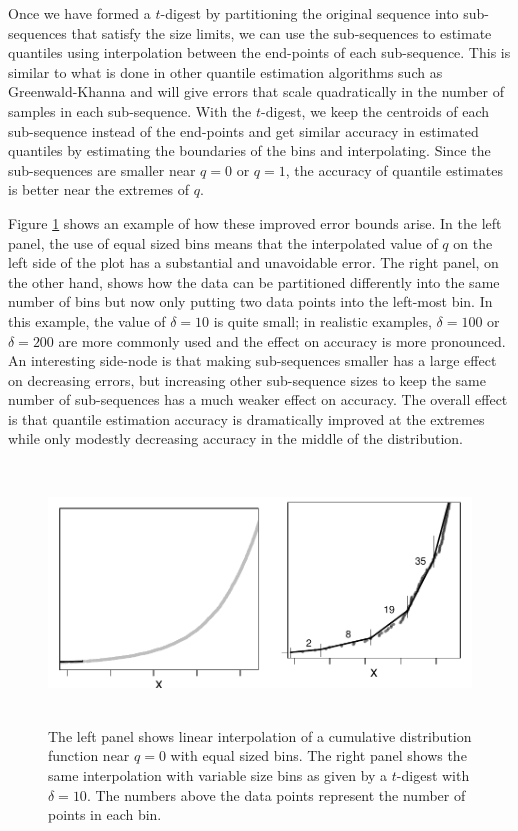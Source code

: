 \documentclass[11pt]{amsart}
\begin{document}
Once we have formed a $t$-digest by partitioning the original sequence into sub-sequences that satisfy the size limits, we can use the sub-sequences to estimate quantiles using interpolation between the end-points of each sub-sequence. This is similar to what is done in other quantile estimation algorithms such as Greenwald-Khanna and will give errors that scale quadratically in the number of samples in each sub-sequence. With the $t$-digest, we keep the centroids of each sub-sequence instead of the end-points and get similar accuracy in estimated quantiles by estimating the boundaries of the bins and interpolating. Since the sub-sequences are smaller near $q=0$ or $q=1$, the accuracy of quantile estimates is better near the extremes of $q$.  

Figure \ref{fig:linear-interpolation} shows an example of how these improved error bounds arise. In the left panel, the use of equal sized bins means that the interpolated value of $q$ on the left side of the plot has a substantial and unavoidable error. The right panel, on the other hand, shows how the data can be partitioned differently into the same number of bins but now only putting two data points into the left-most bin. In this example, the value of $\delta=10$ is quite small; in realistic examples, $\delta=100$ or $\delta=200$ are more commonly used and the effect on accuracy is more pronounced. An interesting side-node is that making  sub-sequences smaller has a large effect on decreasing errors, but increasing other sub-sequence sizes to keep the same number of sub-sequences has a much weaker effect on accuracy. The overall effect is that quantile estimation accuracy is dramatically improved at the extremes while only modestly decreasing accuracy in the middle of the distribution.
\begin{figure}[h] %
   \centering
   \includegraphics[height=2.7in, clip]{linear-interpolation.pdf} 
   \caption{The left panel shows linear interpolation of a cumulative distribution function near $q=0$ with equal sized bins. The right panel shows the same interpolation with variable size bins as given by a $t$-digest with $\delta=10$. The numbers above the data points represent the number of points in each bin. }
   \label{fig:linear-interpolation}
\end{figure}
\end{document}
